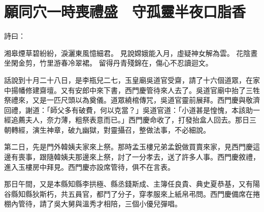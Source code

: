%

\chapter{願同穴一時喪禮盛　守孤靈半夜口脂香}

詩曰：

湘皋煙草碧紛紛，淚灑東風憶細君。
見說嫦娥能入月，虛疑神女解為雲。
花陰晝坐閑金剪，竹里游春冷翠裙。
留得丹青殘錦在，傷心不忍讀迴文。

話說到十月二十八日，是李瓶兒二七，玉皇廟吳道官受齋，請了十六個道眾，在家中揚幡修建齋壇。又有安郎中來下書，西門慶管待來人去了。吳道官廟中抬了三牲祭禮來，又是一匹尺頭以為奠儀。道眾繞棺傳咒，吳道官靈前展拜。西門慶與敬濟回禮，謝道：「師父多有破費，何以克當？」吳道官道：「小道甚是惶愧，本該助一經追薦夫人，奈力薄，粗祭表意而已。」西門慶命收了，打發抬盒人回去。那日三朝轉經，演生神章，破九幽獄，對靈攝召，整做法事，不必細說。

第二日，先是門外韓姨夫家來上祭。那時孟玉樓兄弟孟銳做買賣來家，見西門慶這邊有喪事，跟隨韓姨夫那邊來上祭，討了一分孝去，送了許多人事。西門慶敘禮，進入玉樓房中拜見。西門慶亦設席管待，俱不在言表。

那日午間，又是本縣知縣李拱極、縣丞錢斯成、主簿任良貴、典史夏恭基，又有陽谷縣知縣狄斯朽，共五員官，都鬥了分子，穿孝服來上紙帛弔問。西門慶備席在捲棚內管待，請了吳大舅與溫秀才相陪，三個小優兒彈唱。

